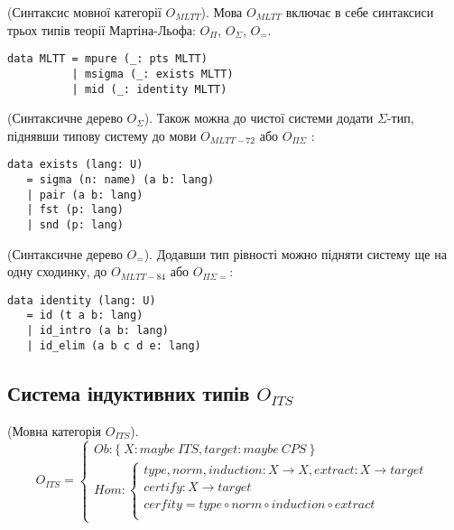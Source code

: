 \begin{definition} (Синтаксис мовної категорії $O_{MLTT}$).
Мова $O_{MLTT}$ включає в себе синтаксиси трьох типів
теорії Мартіна-Льофа: $O_\Pi$, $O_\Sigma$, $O_=$.
\begin{lstlisting}
data MLTT = mpure (_: pts MLTT)
          | msigma (_: exists MLTT)
          | mid (_: identity MLTT)
\end{lstlisting}
\end{definition}

\begin{definition} (Синтаксичне дерево $O_\Sigma$).
Також можна до чистої системи додати $\Sigma$-тип,
піднявши типову систему до мови $O_{MLTT-72}$ або $O_{\Pi\Sigma}$ :
\begin{lstlisting}[mathescape=true]
data exists (lang: U)
   = sigma (n: name) (a b: lang)
   | pair (a b: lang)
   | fst (p: lang)
   | snd (p: lang)
\end{lstlisting}
\end{definition}

\begin{definition} (Синтаксичне дерево $O_=$).
Додавши тип рівності можно підняти систему ще на одну сходинку,
до $O_{MLTT-84}$ або $O_{\Pi\Sigma=}$:
\begin{lstlisting}[mathescape=true]
data identity (lang: U)
   = id (t a b: lang)
   | id_intro (a b: lang)
   | id_elim (a b c d e: lang)
\end{lstlisting}
\end{definition}

\subsection{Система індуктивних типів $O_{ITS}$}

\begin{definition} (Мовна категорія $O_{ITS}$).
\begin{equation}
O_{ITS} =
\begin{cases}
Ob: \{\ X: maybe\ ITS, target: maybe\ CPS\ \} \\
Hom: \begin{cases}
type,norm,induction: X \rightarrow X, extract: X \rightarrow target \\
certify : X \rightarrow target \\
cerfity = type \circ norm \circ induction \circ extract \\
\end{cases}
\end{cases}
\end{equation}
\end{definition}

